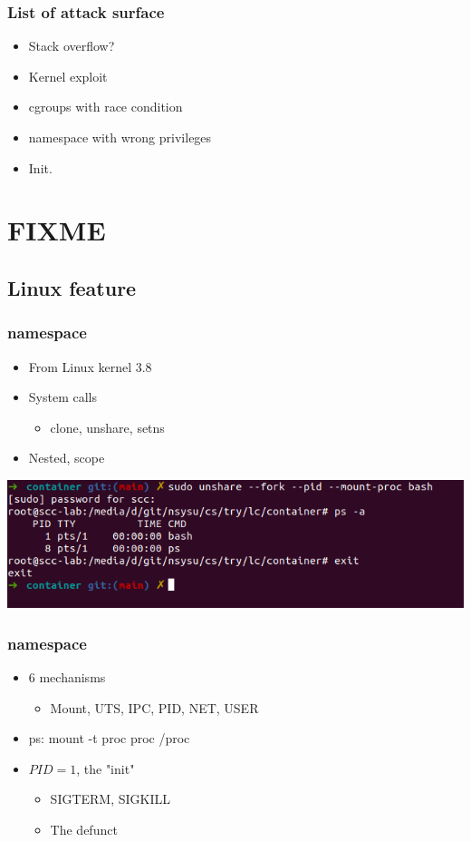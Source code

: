 \documentclass{beamer}
\begin{document}
\begin{frame}
    \frametitle{List of attack surface}
    \begin{itemize}
        \item Stack overflow?
        \item Kernel exploit
        \item cgroups with race condition
        \item namespace with wrong privileges
        \item Init.
    \end{itemize}
\end{frame}


\section{FIXME}
\subsection{Linux feature}
\begin{frame}
    \frametitle{namespace}
    \begin{itemize}
        \item From Linux kernel 3.8
        \item System calls
              \begin{itemize}
                  \item clone, unshare, setns
              \end{itemize}
        \item Nested, scope
    \end{itemize}
    \includegraphics[width=\textwidth]{unshare_cmd.png}
\end{frame}

\begin{frame}
    \frametitle{namespace}
    \begin{itemize}
        \item 6 mechanisms
              \begin{itemize}
                  \item Mount, UTS, IPC, PID, NET, USER
              \end{itemize}
        \item ps: mount -t proc proc /proc
        \item $PID = 1$, the "init"\cite{docker_pid1}
              \begin{itemize}
                  \item SIGTERM, SIGKILL
                  \item The defunct
              \end{itemize}
    \end{itemize}
\end{frame}
\end{document}

